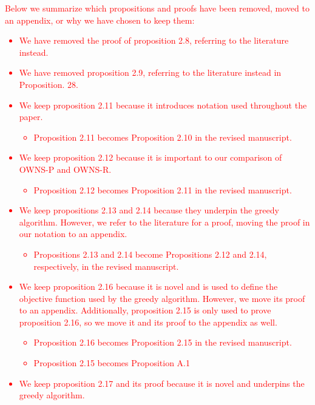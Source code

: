 \documentclass{article}
\newcommand{\response}[1]{\textcolor{red}{#1}}
\begin{document}
\begin{enumerate}
    \response{
    Below we summarize which propositions and proofs have been removed, moved to an appendix, or why we have chosen to keep them:
    \begin{itemize}
        \item We have removed the proof of proposition 2.8, referring to the literature instead.
        \item We have removed proposition 2.9, referring to the literature instead in Proposition. 28.
        \item We keep proposition 2.11 because it introduces notation used throughout the paper.
        \begin{itemize}
            \item Proposition 2.11 becomes Proposition 2.10 in the revised manuscript.
        \end{itemize}
        \item We keep proposition 2.12 because it is important to our comparison of OWNS-P and OWNS-R.
        \begin{itemize}
            \item Proposition 2.12 becomes Proposition 2.11 in the revised manuscript.
        \end{itemize}
        \item We keep propositions 2.13 and 2.14 because they underpin the greedy algorithm. However, we refer to the literature for a proof, moving the proof in our notation to an appendix.
        \begin{itemize}
            \item Propositions 2.13 and 2.14 become Propositions 2.12 and 2.14, respectively, in the revised manuscript.
        \end{itemize}
        \item We keep proposition 2.16 because it is novel and is used to define the objective function used by the greedy algorithm. However, we move its proof to an appendix. Additionally, proposition 2.15 is only used to prove proposition 2.16, so we move it and its proof to the appendix as well.
        \begin{itemize}
            \item Proposition 2.16 becomes Proposition 2.15 in the revised manuscript.
            \item Proposition 2.15 becomes Proposition A.1
        \end{itemize}
        \item We keep proposition 2.17 and its proof because it is novel and underpins the greedy algorithm.

\end{itemize}}
\end{enumerate}
\end{document}
